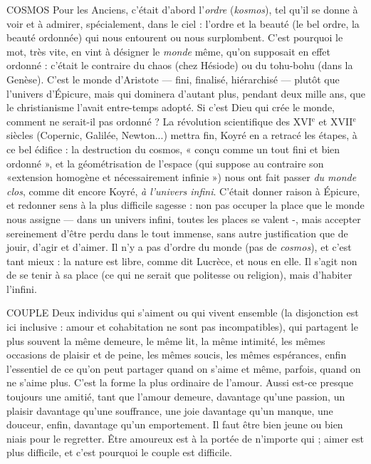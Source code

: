 COSMOS Pour les Anciens, c'était d’abord l’{\it ordre} ({\it kosmos}), tel qu'il se
donne à voir et à admirer, spécialement, dans le ciel : l’ordre et
la beauté (le bel ordre, la beauté ordonnée) qui nous entourent ou nous surplombent.
C’est pourquoi le mot, très vite, en vint à désigner le {\it monde} même,
qu’on supposait en effet ordonné : c'était le contraire du chaos (chez Hésiode)
ou du tohu-bohu (dans la Genèse). C’est le monde d’Aristote — fini, finalisé,
hiérarchisé — plutôt que l’univers d’Épicure, mais qui dominera d’autant plus,
pendant deux mille ans, que le christianisme l’avait entre-temps adopté. Si c’est
Dieu qui crée le monde, comment ne serait-il pas ordonné ? La révolution
scientifique des {\footnotesize XVI$^\text{e}$} et {\footnotesize XVII$^\text{e}$} siècles (Copernic, Galilée, Newton...) mettra fin,
Koyré en a retracé les étapes, à ce bel édifice : la destruction du cosmos, « conçu
comme un tout fini et bien ordonné », et la géométrisation de l’espace (qui
suppose au contraire son «extension homogène et nécessairement infinie »)
nous ont fait passer {\it du monde clos}, comme dit encore Koyré, {\it à l'univers infini}.
C'était donner raison à Épicure, et redonner sens à la plus difficile sagesse : non
pas occuper la place que le monde nous assigne — dans un univers infini, toutes
les places se valent -, mais accepter sereinement d’être perdu dans le tout
immense, sans autre justification que de jouir, d’agir et d’aimer. Il n’y a pas
d'ordre du monde (pas de {\it cosmos}), et c’est tant mieux : la nature est libre,
comme dit Lucrèce, et nous en elle. Il s’agit non de se tenir à sa place (ce qui
ne serait que politesse ou religion), mais d’habiter l'infini.

COUPLE Deux individus qui s’aiment ou qui vivent ensemble (la disjonction
est ici inclusive : amour et cohabitation ne sont pas incompatibles),
qui partagent le plus souvent la même demeure, le même lit, la même
intimité, les mêmes occasions de plaisir et de peine, les mêmes soucis, les
mêmes espérances, enfin l'essentiel de ce qu’on peut partager quand on s’aime
et même, parfois, quand on ne s'aime plus. C’est la forme la plus ordinaire de
l'amour. Aussi est-ce presque toujours une amitié, tant que l’amour demeure,
davantage qu’une passion, un plaisir davantage qu’une souffrance, une joie
davantage qu’un manque, une douceur, enfin, davantage qu’un emportement.
Il faut être bien jeune ou bien niais pour le regretter. Être amoureux est à la
portée de n'importe qui ; aimer est plus difficile, et c’est pourquoi le couple est
difficile.


